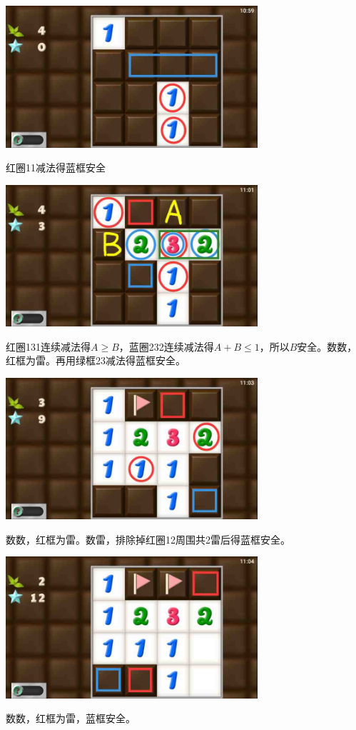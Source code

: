 \subsection{} %
\begin{center}
    \includegraphics[width=0.7\textwidth]{puzzlelow/125-1.jpg}
\end{center}
红圈11减法得蓝框安全
\begin{center}
    \includegraphics[width=0.7\textwidth]{puzzlelow/125-2.jpg}
\end{center}
红圈131连续减法得$A\ge B$，蓝圈232连续减法得$A+B\le 1$，所以$B$安全。数数，红框为雷。再用绿框23减法得蓝框安全。
\begin{center}
    \includegraphics[width=0.7\textwidth]{puzzlelow/125-3.jpg}
\end{center}
数数，红框为雷。数雷，排除掉红圈12周围共2雷后得蓝框安全。
\begin{center}
    \includegraphics[width=0.7\textwidth]{puzzlelow/125-4.jpg}
\end{center}
数数，红框为雷，蓝框安全。

